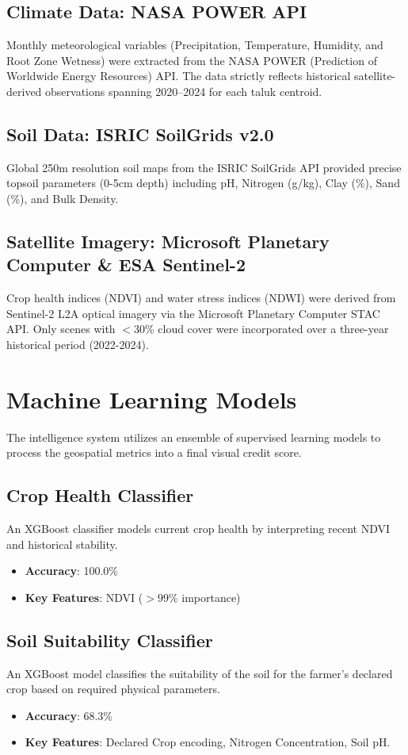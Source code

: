 \documentclass[12pt,a4paper]{article}
\begin{document}
\subsection{Climate Data: NASA POWER API}
Monthly meteorological variables (Precipitation, Temperature, Humidity, and Root Zone Wetness) were extracted from the NASA POWER (Prediction of Worldwide Energy Resources) API. The data strictly reflects historical satellite-derived observations spanning 2020--2024 for each taluk centroid.

\subsection{Soil Data: ISRIC SoilGrids v2.0}
Global 250m resolution soil maps from the ISRIC SoilGrids API provided precise topsoil parameters (0-5cm depth) including pH, Nitrogen (g/kg), Clay (\%), Sand (\%), and Bulk Density. 

\subsection{Satellite Imagery: Microsoft Planetary Computer \& ESA Sentinel-2}
Crop health indices (NDVI) and water stress indices (NDWI) were derived from Sentinel-2 L2A optical imagery via the Microsoft Planetary Computer STAC API. Only scenes with $<$30\% cloud cover were incorporated over a three-year historical period (2022-2024).

\section{Machine Learning Models}
The intelligence system utilizes an ensemble of supervised learning models to process the geospatial metrics into a final visual credit score.

\subsection{Crop Health Classifier}
An XGBoost classifier models current crop health by interpreting recent NDVI and historical stability.
\begin{itemize}
    \item \textbf{Accuracy}: 100.0\%
    \item \textbf{Key Features}: NDVI ($>99\%$ importance)
\end{itemize}

\subsection{Soil Suitability Classifier}
An XGBoost model classifies the suitability of the soil for the farmer's declared crop based on required physical parameters.
\begin{itemize}
    \item \textbf{Accuracy}: 68.3\%
    \item \textbf{Key Features}: Declared Crop encoding, Nitrogen Concentration, Soil pH.
\end{itemize}
\end{document}
